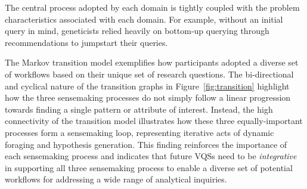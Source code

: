  The central process adopted by each domain
 is tightly coupled with the problem characteristics associated with each domain. For example, without an initial query in mind,
 geneticists relied heavily on bottom-up querying
 through recommendations to jumpstart their queries.
 \par The Markov transition model exemplifies how participants
 adopted a diverse set of workflows
 based on their unique set of research questions. The bi-directional and cyclical nature
 of the transition graphs in Figure~\ref{fig:transition} highlight how the three sensemaking processes do not simply follow a linear progression towards finding a single pattern or attribute of interest. %
 Instead, the high connectivity of the transition model illustrates how these three equally-important processes form a sensemaking loop, representing iterative acts of dynamic foraging and hypothesis generation. This finding reinforces the importance of each sensemaking process and indicates that future VQSs need to be \emph{integrative} in supporting all three sensemaking process to enable a diverse set of potential workflows for addressing a wide range of analytical inquiries. %
